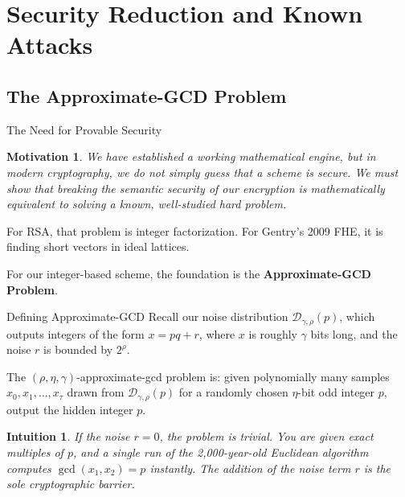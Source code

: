 \documentclass[10pt,handout]{beamer}
\newtheorem{intuition}{Intuition}
\newtheorem{motivation}{Motivation}
\begin{document}

\section{Security Reduction and Known Attacks}

\subsection{The Approximate-GCD Problem}

\begin{frame}{The Need for Provable Security}
    \begin{motivation}
    We have established a working mathematical engine, but in modern cryptography, we do not simply \textit{guess} that a scheme is secure. We must show that breaking the semantic security of our encryption is mathematically equivalent to solving a known, well-studied hard problem.
    \end{motivation}
    \pause
    
    \vspace{0.3cm}
    For RSA, that problem is integer factorization. For Gentry's 2009 FHE, it is finding short vectors in ideal lattices.
    \pause
    
    \vspace{0.3cm}
    For our integer-based scheme, the foundation is the \textbf{Approximate-GCD Problem}.
\end{frame}

\begin{frame}{Defining Approximate-GCD}
    Recall our noise distribution $\mathcal{D}_{\gamma,\rho}(p)$, which outputs integers of the form $x = pq + r$, where $x$ is roughly $\gamma$ bits long, and the noise $r$ is bounded by $2^\rho$.
    \pause

    \vspace{0.3cm}
    \begin{definition}
    The $(\rho, \eta, \gamma)$-approximate-gcd problem is: given polynomially many samples $x_0, x_1, \dots, x_\tau$ drawn from $\mathcal{D}_{\gamma,\rho}(p)$ for a randomly chosen $\eta$-bit odd integer $p$, output the hidden integer $p$.
    \end{definition}
    \pause
    
    \vspace{0.3cm}
    \begin{intuition}
    If the noise $r=0$, the problem is trivial. You are given exact multiples of $p$, and a single run of the 2,000-year-old Euclidean algorithm computes $\gcd(x_1, x_2) = p$ instantly. The addition of the noise term $r$ is the sole cryptographic barrier.
    \end{intuition}
\end{frame}
\end{document}
